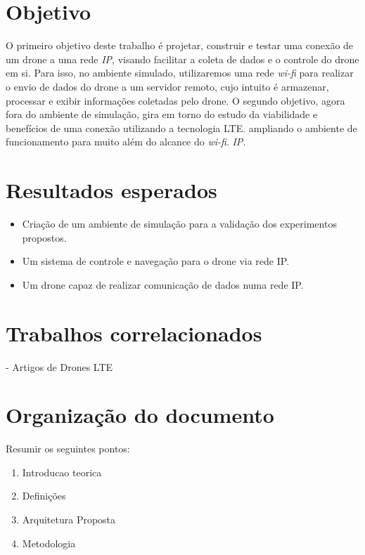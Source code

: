 \documentclass[12pt,a4paper,oneside]{book}
\begin{document}
\section{Objetivo}

O primeiro objetivo deste trabalho é projetar, construir e testar uma conexão de  um drone a uma rede \textit{IP}, visando facilitar a coleta de dados e o controle do drone em si. Para isso, no ambiente simulado, utilizaremos uma rede \textit{wi-fi} para realizar o envio de dados do drone a um servidor remoto, cujo intuito é armazenar, processar e exibir informações coletadas pelo drone. O segundo objetivo, agora fora do ambiente de simulação, gira em torno do estudo da viabilidade e benefícios 
de uma conexão utilizando a tecnologia LTE. ampliando o ambiente de funcionamento para muito além do alcance do \textit{wi-fi}.
\textit{IP}.  

\section{Resultados esperados}

\begin{itemize}
\item Criação de um ambiente de simulação para a validação dos experimentos propostos.
\item Um sistema de controle e navegação para o drone via rede IP.
\item Um drone capaz de realizar comunicação de dados numa rede IP.    
\end{itemize}

\section{Trabalhos correlacionados}

 - Artigos de Drones LTE
 \cite{artigo_relacionado_1}

\section{Organização do documento}
Resumir os seguintes pontos:
\begin{enumerate}
    \item Introducao teorica
    \item Definições
    \item Arquitetura Proposta
    \item Metodologia
\end{enumerate}
\end{document}
